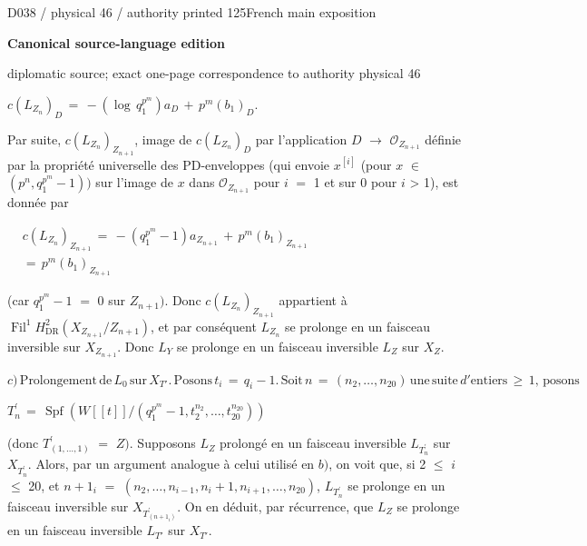 \documentclass[9pt]{article}
\newcommand{\CanonText}[1]{\par{\fontsize{8.0}{9.35}\selectfont\RaggedRight #1\par}\vspace{2.2pt}}
\newcommand{\CanonDisplay}[1]{\par\vspace{1.2pt}\begin{center}{\fontsize{7.2}{8.4}\selectfont\(\displaystyle #1\)}\end{center}\vspace{1.2pt}}
\newenvironment{CanonMathBlock}{\par\vspace{1.2pt}\begin{center}\fontsize{6.8}{8.0}\selectfont\(\displaystyle}{\)\end{center}\vspace{1.2pt}}
\newcommand{\LayerTitle}{Canonical source-language edition}
\begin{document}
\noindent\begin{minipage}[t][\dimexpr\textheight-5pt\relax][t]{\textwidth}
{\sffamily\fontsize{7.3}{8.2}\selectfont\color{Quiet} D038 / physical 46 / authority printed 125\hfill French main exposition}
\par{}\vspace{4.5pt}
{\sffamily\fontsize{10.4}{11.6}\selectfont\bfseries\color{Accent} \LayerTitle}
\par{\sffamily\fontsize{6.7}{7.7}\selectfont\color{Quiet} diplomatic source; exact one-page correspondence to authority physical 46}
\vspace{5pt}
\CanonDisplay{c(L_{Z_{n}})_{D}\,=\,-(\operatorname{log}\,q_{1}^{p^{m}})a_{D}\,+\,p^{m}(b_{1})_{D}.}
\CanonText{Par suite, \(c(L_{Z_{n}})_{Z_{n+1}}\), image de \(c(L_{Z_{n}})_{D}\) par l'application \(D\) \(\to{}\) \(\mathcal{O}_{Z_{n+1}}\) définie par la propriété universelle des PD-enveloppes (qui envoie \(x^{[i]}\) (pour \(x\) \(\in{}\) \((p^{n},q_{1}^{p^{m}}-1))\) sur l'image de \(x\) dans \(\mathcal{O}_{Z_{n+1}}\) pour \(i\) \(=\) 1 et sur 0 pour \(i\) > 1), est donnée par}
\begin{CanonMathBlock}
\begin{aligned}
& c(L_{Z_{n}})_{Z_{n+1}}\,=\,-(q_{1}^{p^{m}}-1)a_{Z_{n+1}}\,+\,p^{m}(b_{1})_{Z_{n+1}}\\
& =\,p^{m}(b_{1})_{Z_{n+1}}
\end{aligned}
\end{CanonMathBlock}
\CanonText{(car \(q_{1}^{p^{m}}-1\) \(=\) 0 sur \(Z_{n+1})\). Donc \(c(L_{Z_{n}})_{Z_{n+1}}\) appartient à \(\operatorname{Fil}^{1}H^{2}_{\mathrm{DR}}(X_{Z_{n+1}}/Z_{n+1})\), et par conséquent \(L_{Z_{n}}\) se prolonge en un faisceau inversible sur \(X_{Z_{n+1}}\). Donc \(L_{Y}\) se prolonge en un faisceau inversible \(L_{Z}\) sur \(X_{Z}\).}
\CanonDisplay{c)\,\text{Prolongement}\,\text{de}\,L_{0}\,\text{sur}\,X_{T'}.\,\text{Posons}\,t_{i}\,=\,q_{i}-1.\,\text{Soit}\,n\,=\,(n_{2},\ldots{},n_{20})\,\text{une}\,\text{suite}\,d'\text{entiers}\,\geq{}\,1,\,\text{posons}}
\CanonDisplay{T^{\prime}_{n}\,=\,\operatorname{Spf}(W[[t]]/(q_{1}^{p^{m}}-1,t_{2}^{n_{2}},\ldots{},t_{20}^{n_{20}}))}
\CanonText{(donc \(T^{\prime}_{(1,\ldots{},1)}\) \(=\) \(Z)\). Supposons \(L_{Z}\) prolongé en un faisceau inversible \(L_{T^{\prime}_{n}}\) sur \(X_{T^{\prime}_{n}}\). Alors, par un argument analogue à celui utilisé en \(b)\), on voit que, si 2 \(\leq{}\) \(i\) \(\leq{}\) 20, et \(n+1_{i}\) \(=\) \((n_{2},\ldots{},n_{i-1},n_{i}+1,n_{i+1},\ldots{},n_{20})\), \(L_{T^{\prime}_{n}}\) se prolonge en un faisceau inversible sur \(X_{T^{\prime}_{(n+1_{i})}}\). On en déduit, par récurrence, que \(L_{Z}\) se prolonge en un faisceau inversible \(L_{T'}\) sur \(X_{T'}\).}

\end{minipage}
\end{document}
